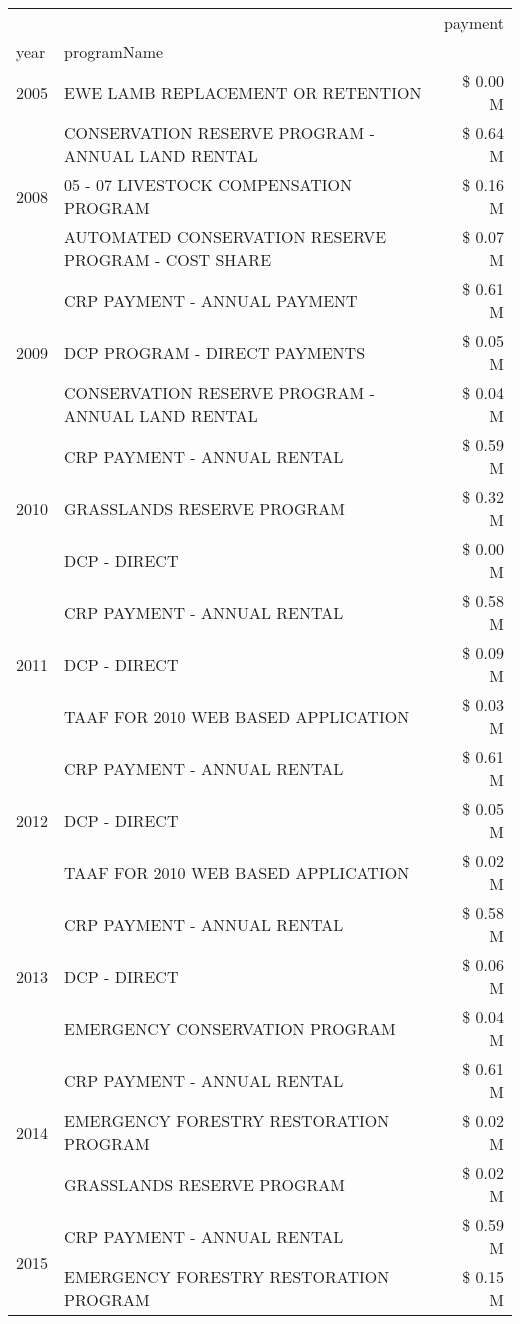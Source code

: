 \begin{tabular}{llr}
\toprule
 &  & payment \\
year & programName &  \\
\midrule
2005 & EWE LAMB REPLACEMENT OR RETENTION & \$ 0.00 M \\
\cline{1-3}
\multirow[t]{3}{*}{2008} & CONSERVATION RESERVE PROGRAM - ANNUAL LAND RENTAL & \$ 0.64 M \\
 & 05 - 07 LIVESTOCK COMPENSATION PROGRAM & \$ 0.16 M \\
 & AUTOMATED CONSERVATION RESERVE PROGRAM - COST SHARE & \$ 0.07 M \\
\cline{1-3}
\multirow[t]{3}{*}{2009} & CRP PAYMENT - ANNUAL PAYMENT & \$ 0.61 M \\
 & DCP PROGRAM - DIRECT PAYMENTS & \$ 0.05 M \\
 & CONSERVATION RESERVE PROGRAM - ANNUAL LAND RENTAL & \$ 0.04 M \\
\cline{1-3}
\multirow[t]{3}{*}{2010} & CRP PAYMENT - ANNUAL RENTAL & \$ 0.59 M \\
 & GRASSLANDS RESERVE PROGRAM & \$ 0.32 M \\
 & DCP - DIRECT & \$ 0.00 M \\
\cline{1-3}
\multirow[t]{3}{*}{2011} & CRP PAYMENT - ANNUAL RENTAL & \$ 0.58 M \\
 & DCP - DIRECT & \$ 0.09 M \\
 & TAAF FOR 2010 WEB BASED APPLICATION & \$ 0.03 M \\
\cline{1-3}
\multirow[t]{3}{*}{2012} & CRP PAYMENT - ANNUAL RENTAL & \$ 0.61 M \\
 & DCP - DIRECT & \$ 0.05 M \\
 & TAAF FOR 2010 WEB BASED APPLICATION & \$ 0.02 M \\
\cline{1-3}
\multirow[t]{3}{*}{2013} & CRP PAYMENT - ANNUAL RENTAL & \$ 0.58 M \\
 & DCP - DIRECT & \$ 0.06 M \\
 & EMERGENCY CONSERVATION PROGRAM & \$ 0.04 M \\
\cline{1-3}
\multirow[t]{3}{*}{2014} & CRP PAYMENT - ANNUAL RENTAL & \$ 0.61 M \\
 & EMERGENCY FORESTRY RESTORATION PROGRAM & \$ 0.02 M \\
 & GRASSLANDS RESERVE PROGRAM & \$ 0.02 M \\
\cline{1-3}
\multirow[t]{3}{*}{2015} & CRP PAYMENT - ANNUAL RENTAL & \$ 0.59 M \\
 & EMERGENCY FORESTRY RESTORATION PROGRAM & \$ 0.15 M \\

\end{tabular}
